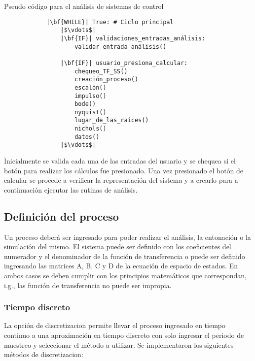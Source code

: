     \begin{longlisting}
        \caption[Pseudo código - Análisis de sistemas de control]{Pseudo código para el análisis de sistemas de control}
        \label{code:analisis}				
        \begin{verbatim}
            |\bf{WHILE}| True: # Ciclo principal
                |$\vdots$|
                |\bf{IF}| validaciones_entradas_análisis:
                    validar_entrada_análisis()
                
                |\bf{IF}| usuario_presiona_calcular:
                    chequeo_TF_SS()
                    creación_proceso()
                    escalón()
                    impulso()
                    bode()
                    nyquist()
                    lugar_de_las_raíces()
                    nichols()
                    datos()
                |$\vdots$|
        \end{verbatim}
    \end{longlisting}

    Inicialmente se valida cada una de las entradas del usuario y se chequea si el botón para realizar los cálculos fue presionado. Una vez presionado el botón de calcular se procede a verificar la representación del sistema y a crearlo para a continuación ejecutar las rutinas de análisis.

    \subsection{Definición del proceso}

        Un proceso deberá ser ingresado para poder realizar el análisis, la entonación o la simulación del mismo. El sistema puede ser definido con los coeficientes del numerador y el denominador de la función de transferencia o puede ser definido ingresando las matrices A, B, C y D de la ecuación de espacio de estados. En ambos casos se deben cumplir con los principios matemáticos que correspondan, i.g., las función de transferencia no puede ser impropia.

    \subsubsection{Tiempo discreto}

        La opción de discretizacion permite llevar el proceso ingresado en tiempo continuo a una aproximación en tiempo discreto con solo ingresar el periodo de muestreo y seleccionar el método a utilizar. Se implementaron los siguientes métodos de discretizacion:

